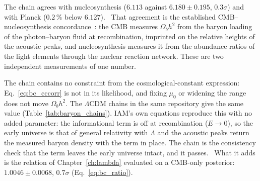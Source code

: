 The chain agrees with nucleosynthesis ($6.113$ against $6.180\pm0.195$, $0.3\sigma$) and with Planck ($0.2\,\%$ below $6.127$).
\calc\ That agreement is the established CMB--nucleosynthesis concordance~\cite{Cyburt2016,Planck2018VI}: the CMB measures $\Omega_bh^2$
from the baryon loading of the photon--baryon fluid at recombination, imprinted on the relative heights of the acoustic peaks, and
nucleosynthesis measures it from the abundance ratios of the light elements through the nuclear reaction network. These are two
independent measurements of one number. \observed

The chain contains no constraint from the cosmological-constant expression: Eq.~\eqref{eq:bc_cccorr} is not in its likelihood, and fixing
$\mu_0$ or widening the range does not move $\Omega_bh^2$. The $\Lambda$CDM chains in the same repository give the same value
(Table~\ref{tab:baryon_chains}). IAM's own equations reproduce this with no added parameter: the informational term is off at recombination ($E\to0$), so the early
universe is that of general relativity with $\Lambda$ and the acoustic peaks return the measured baryon density with the term in place. The chain is the consistency check that the term
leaves the early universe intact, and it passes. \observed\ What it adds is the relation of Chapter~\ref{ch:lambda} evaluated on a
CMB-only posterior: $1.0046\pm0.0068$, $0.7\sigma$ (Eq.~\eqref{eq:bc_ratio}). \measured

